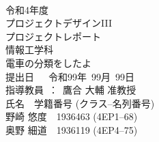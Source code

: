 
\begin{titlepage}
 \begin{center}
  ~\\
  \vspace{1cm}
  {\Large 
  令和4年度\\
 プロジェクトデザインIII\\
  プロジェクトレポート\\
情報工学科\\}
  \vspace{1.3in}
  {\Huge \gtfamily
電車の分類をしたよ\\
  }
  \vspace{2in}
  {\LARGE 
  提出日~~~令和99年~99月~99日\\
  \vspace{0.4in}
  指導教員~：~鷹合 大輔 准教授\\
 \vspace{0.9in}
  氏名　学籍番号 (クラス--名列番号)\\
  \vspace{2mm}
  野崎 悠度　1936463 (4EP1--68)\\
  奥野 細道　1936119 (4EP4--75)\\
  }
 \end{center}
\end{titlepage}
